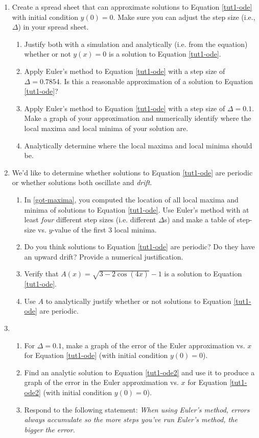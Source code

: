 		\begin{enumerate}
			\item Create a spread sheet that can approximate solutions to Equation \eqref{tut1-ode} with initial condition $y(0)=0$. Make sure you
			can adjust the step size (i.e., $\Delta$) in your spread sheet.
				\begin{enumerate}
					\item Justify both with a simulation and analytically (i.e. from the equation) whether or not $y(x)=0$
					is a solution to Equation \eqref{tut1-ode}.
					\item Apply Euler's method to Equation \eqref{tut1-ode} with a step size of $\Delta=0.7854$. Is this a reasonable approximation
					of a solution to Equation \eqref{tut1-ode}?
					\item Apply Euler's method to Equation \eqref{tut1-ode} with a step size of $\Delta=0.1$. Make a graph of your approximation
					and numerically identify where the local maxima and local minima of your solution are.
					\item Analytically determine where the local maxima and
					local minima should be.
					\label{got-maxima}
				\end{enumerate}

			\item We'd like to determine whether solutions to Equation \eqref{tut1-ode} are periodic or whether solutions both oscillate and \emph{drift}.
				\begin{enumerate}
					\item In \ref{got-maxima}, you computed the location of all local maxima and minima of solutions to Equation \eqref{tut1-ode}.
					Use Euler's method with at least \emph{four} different step sizes (i.e. different $\Delta$s) and make a table of step-size vs. 
					$y$-value of the first 3 local minima.
					\item Do you think solutions to Equation \eqref{tut1-ode} are periodic? Do they have an upward drift? Provide a numerical justification.
					\item Verify that $A(x)=\sqrt{3-2\cos(4x)}-1$ is a solution to Equation \eqref{tut1-ode}.
					\item Use $A$ to analytically justify whether or not solutions to Equation \eqref{tut1-ode} are periodic.
				\end{enumerate}

			\item
				\begin{enumerate}
					\item For $\Delta=0.1$, make a graph of the error of the Euler approximation vs. $x$ for Equation \eqref{tut1-ode} (with initial condition $y(0)=0$).
					\item Find an analytic solution to Equation \eqref{tut1-ode2} and use it to produce a graph of the error in the
					Euler approximation vs. $x$ for Equation \eqref{tut1-ode2} (with initial condition $y(0)=0$).
					\item Respond to the following statement: \emph{When using Euler's method, errors always accumulate so the more steps you've run
					Euler's method, the bigger the error.}
				\end{enumerate}

		\end{enumerate}

